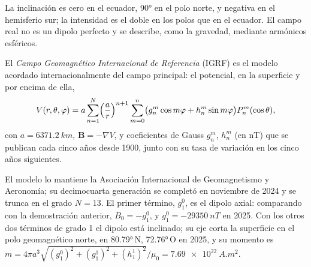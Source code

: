 La inclinación es cero en el ecuador, \ang{90} en el polo norte, y
negativa en el hemisferio sur; la intensidad es el doble en los polos que en el
ecuador. El campo real no es un dipolo perfecto y se describe, como la gravedad,
mediante armónicos esféricos.

\begin{definition}\label{def:b3:palaeomagnetism:igrf}
El \emph{Campo Geomagnético Internacional de Referencia}
(IGRF) es el modelo acordado internacionalmente del
campo principal: el potencial, en la superficie y por encima de ella,
\[
  V(r,\theta,\varphi) = a\sum_{n=1}^{N}\Bigl(\frac ar\Bigr)^{n+1}\sum_{m=0}^{n}
  \bigl(g_n^m\cos m\varphi + h_n^m\sin m\varphi\bigr)P_n^m(\cos\theta),
\]
con $a = \qty{6371.2}{km}$, $\mathbf B = -\nabla V$, y coeficientes de Gauss
$g_n^m$, $h_n^m$ (en \unit{nT}) que se publican cada cinco años desde 1900, junto
con su tasa de variación en los cinco años siguientes.
\end{definition}

El modelo lo mantiene la Asociación Internacional de Geomagnetismo y
Aeronomía; su decimocuarta generación se completó en noviembre de 2024 y se
trunca en el grado $N = 13$. El primer término, $g_1^0$, es el dipolo axial:
comparando con la demostración anterior, $B_0 = -g_1^0$, y $g_1^0 = \qty{-29350}{nT}$
en 2025. Con los otros dos términos de grado 1 el dipolo está inclinado; su eje corta
la superficie en el polo geomagnético norte, en \ang{80.79}\,N, \ang{72.76}\,O en
2025, y su momento es $m = 4\pi a^3\sqrt{(g_1^0)^2 + (g_1^1)^2 +
(h_1^1)^2}/\mu_0 = \qty{7.69e22}{A.m^2}$.

